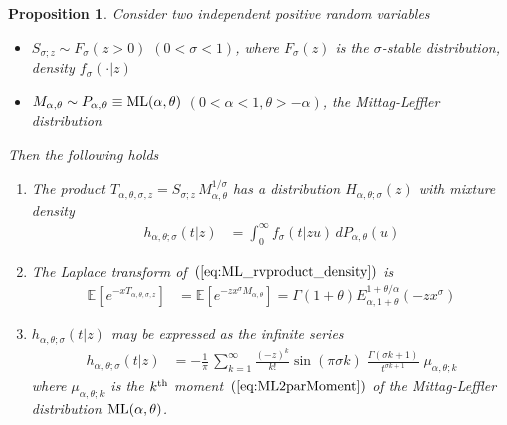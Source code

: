 \documentclass[a4paper,12pt]{article}
\newtheorem{proposition}{Proposition}
\begin{document}
{{ \begin{proposition}
\label{prop:ML_rvproduct}
Consider two  independent  positive random variables
\begin{itemize}
\setlength{\itemsep}{0pt}
\item $S_{\sigma;z} \sim F_\sigma(z>0)$ $(0<\sigma<1)$,  where $F_\sigma(z)$ is  the  
$\sigma$-stable distribution, density $f_\sigma(\cdot\vert z)$ 
\item $M_{\alpha,\theta} \sim P_{\alpha,\theta} \equiv {\rm ML}(\alpha,\theta)$ $(0<\alpha<1, \theta>-\alpha)$,  
the   Mittag-Leffler distribution %
\end{itemize}
Then the following holds
\begin{enumerate}
\setlength{\itemsep}{0pt}
\item The product $T_{\alpha,\theta,\sigma,z}=S_{\sigma;z} \, M_{\alpha,\theta}^{1/\sigma}$  has a distribution $H_{\alpha,\theta; \sigma}(z)$ with mixture density
\begin{align}
h_{\alpha,\theta; \sigma}(t \vert z)
&=  \int_0^\infty  f_\sigma(t \vert z u) \, dP_{\alpha,\theta}(u)
\label{eq:ML_rvproduct_density}
\end{align}
\item The  Laplace transform %
of~$(\ref{eq:ML_rvproduct_density})$ is 
\begin{align}
 \mathbb{E}\left[e^{-xT_{\alpha,\theta,\sigma,z}}\right]  &=  \mathbb{E}\left[e^{-zx^\sigma M_{\alpha,\theta}}\right] 
 = \Gamma(1+\theta)E^{1+\theta/\alpha}_{\alpha,1+\theta}(-z x^\sigma)   %
\label{eq:ML_densityLT} 
\end{align}
\item $h_{\alpha,\theta; \sigma}(t \vert z)$  may  be expressed as the infinite series
\begin{align}
h_{\alpha,\theta; \sigma}(t \vert z)
&= -  \frac{1}{\pi}\,   \sum_{k=1}^\infty  \frac{(-z)^k}{k!} \sin(\pi\sigma k) \; \frac{\Gamma(\sigma k+1)}{t^{\sigma k+1}}  \; \mu_{\alpha,\theta;k}
\label{eq:ML_rvproduct_density_iinfseries}
\end{align}
where $\mu_{\alpha,\theta;k}$ is the $k^{\rm th}$ moment~$(\ref{eq:ML2parMoment})$ of the Mittag-Leffler distribution ${\rm ML}(\alpha,\theta)$.
\end{enumerate}
\end{proposition}

}}
\end{document}
